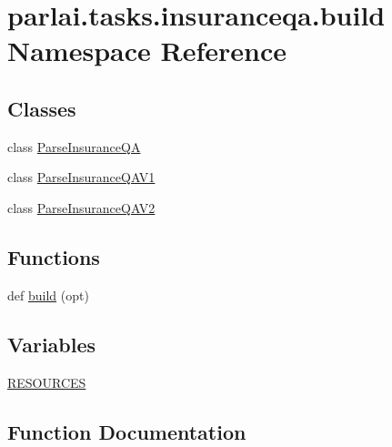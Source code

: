 \hypertarget{namespaceparlai_1_1tasks_1_1insuranceqa_1_1build}{}\section{parlai.\+tasks.\+insuranceqa.\+build Namespace Reference}
\label{namespaceparlai_1_1tasks_1_1insuranceqa_1_1build}
\subsection*{Classes}
\begin{DoxyCompactItemize}
\item 
class \hyperlink{classparlai_1_1tasks_1_1insuranceqa_1_1build_1_1ParseInsuranceQA}{Parse\+Insurance\+QA}
\item 
class \hyperlink{classparlai_1_1tasks_1_1insuranceqa_1_1build_1_1ParseInsuranceQAV1}{Parse\+Insurance\+Q\+A\+V1}
\item 
class \hyperlink{classparlai_1_1tasks_1_1insuranceqa_1_1build_1_1ParseInsuranceQAV2}{Parse\+Insurance\+Q\+A\+V2}
\end{DoxyCompactItemize}
\subsection*{Functions}
\begin{DoxyCompactItemize}
\item 
def \hyperlink{namespaceparlai_1_1tasks_1_1insuranceqa_1_1build_ae48219c5a8158e6688a2b3dba93a99a2}{build} (opt)
\end{DoxyCompactItemize}
\subsection*{Variables}
\begin{DoxyCompactItemize}
\item 
\hyperlink{namespaceparlai_1_1tasks_1_1insuranceqa_1_1build_aded34e650b79ad5271e4685269ba6051}{R\+E\+S\+O\+U\+R\+C\+ES}
\end{DoxyCompactItemize}


\subsection{Function Documentation}
\mbox{\label{namespaceparlai_1_1tasks_1_1insuranceqa_1_1build_ae48219c5a8158e6688a2b3dba93a99a2}} 
